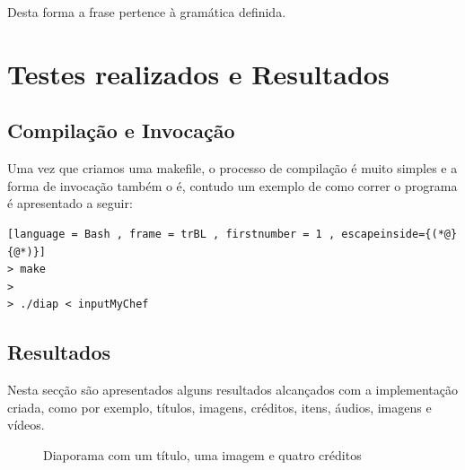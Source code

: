 \documentclass[11pt,a4paper]{report}
\begin{document}
Desta forma a frase pertence à gramática definida.

\newpage

\section{Testes realizados e Resultados}

\subsection{Compilação e Invocação}

Uma vez que criamos uma makefile, o processo de compilação é muito simples e a forma de invocação também o é, contudo um exemplo de como correr o programa é apresentado a seguir:

\begin{lstlisting}[language = Bash , frame = trBL , firstnumber = 1 , escapeinside={(*@}{@*)}]
> make
>
> ./diap < inputMyChef
\end{lstlisting}


\subsection{Resultados}

Nesta secção são apresentados alguns resultados alcançados com a implementação criada, como por exemplo, títulos, imagens, créditos, itens, áudios, imagens e vídeos.

\begin{figure}[H]
\centering
{}
\caption{Diaporama com um título, uma imagem e quatro créditos}
\label{img:exemplo1}
\end{figure}
\end{document}
